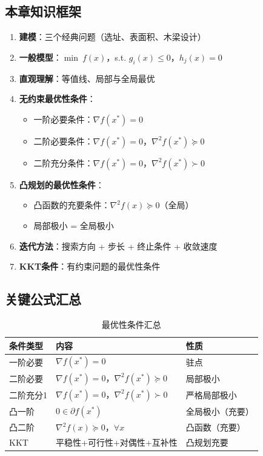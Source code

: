 \subsection{本章知识框架}

\begin{conceptbox}
\begin{enumerate}[label=\arabic*., leftmargin=2em]
    \item \textbf{建模}：三个经典问题（选址、表面积、木梁设计）
    \item \textbf{一般模型}：$\min\ f(x)$，s.t. $g_i(x) \leq 0$，$h_j(x) = 0$
    \item \textbf{直观理解}：等值线、局部与全局最优
    \item \textbf{无约束最优性条件}：
    \begin{itemize}
        \item 一阶必要条件：$\nabla f(x^*) = 0$
        \item 二阶必要条件：$\nabla f(x^*) = 0$，$\nabla^2 f(x^*) \succeq 0$
        \item 二阶充分条件：$\nabla f(x^*) = 0$，$\nabla^2 f(x^*) \succ 0$
    \end{itemize}
    \item \textbf{凸规划的最优性条件}：
    \begin{itemize}
        \item 凸函数的充要条件：$\nabla^2 f(x) \succeq 0$（全局）
        \item 局部极小 = 全局极小
    \end{itemize}
    \item \textbf{迭代方法}：搜索方向 + 步长 + 终止条件 + 收敛速度
    \item \textbf{KKT条件}：有约束问题的最优性条件
\end{enumerate}
\end{conceptbox}

\subsection{关键公式汇总}

\begin{table}[htbp]
\centering
\caption{最优性条件汇总}
\begin{tabular}{@{}lll@{}}
\toprule
\textbf{条件类型} & \textbf{内容} & \textbf{性质} \\
\midrule
一阶必要 & $\nabla f(x^*) = 0$ & 驻点 \\
二阶必要 & $\nabla f(x^*) = 0$，$\nabla^2 f(x^*) \succeq 0$ & 局部极小 \\
二阶充分1 & $\nabla f(x^*) = 0$，$\nabla^2 f(x^*) \succ 0$ & 严格局部极小 \\
凸一阶 & $0 \in \partial f(x^*)$ & 全局极小（充要） \\
凸二阶 & $\nabla^2 f(x) \succeq 0$，$\forall x$ & 凸函数（充要） \\
KKT & 平稳性+可行性+对偶性+互补性 & 凸规划充要 \\
\bottomrule
\end{tabular}
\end{table}

